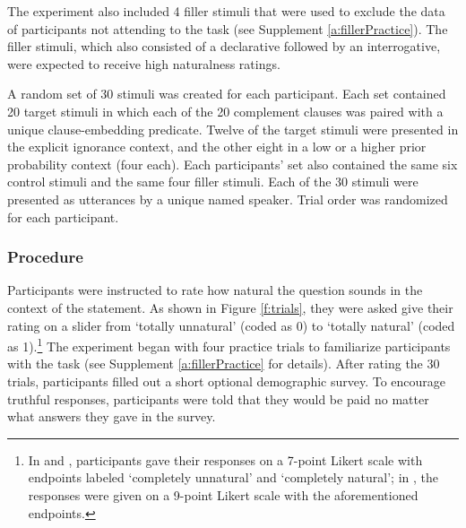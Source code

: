 \documentclass[11pt,fleqn]{article}
\newcommand{\6}{\mbox{$[\hspace*{-.6mm}[$}}
\newcommand{\9}{\mbox{$]\hspace*{-.6mm}]$}}
\begin{document}
The experiment also included 4 filler stimuli that were used to exclude the data of participants not attending to the task (see Supplement \ref{a:fillerPractice}). The filler stimuli, which also consisted of a declarative followed by an interrogative, were expected to receive high naturalness ratings.

A random set of 30 stimuli was created for each participant. Each set contained 20 target stimuli in which each of the 20 complement clauses was paired with a unique clause-embedding predicate. Twelve of the target stimuli were presented in the explicit ignorance context, and the other eight in a low or a higher prior probability context (four each). Each participants' set also contained the same six control stimuli and the same four filler stimuli. Each of the 30 stimuli were presented as utterances by a unique named speaker. Trial order was randomized for each participant. 

\subsubsection{Procedure}

Participants were instructed to rate how natural the question sounds in the context of the statement. As shown in Figure \ref{f:trials}, they were asked give their rating on a slider from `totally unnatural' (coded as 0) to `totally natural' (coded as 1).\footnote{In \citealt[Exp.~3]{mandelkern-etal2020} and \citealt[Exp.1]{kalomoiros-schwarz2024}, participants gave their responses on a 7-point Likert scale with endpoints labeled `completely unnatural' and `completely natural';  in \citealt[Exp.~2]{kalomoiros-schwarz2024}, the responses were given on a 9-point Likert scale with the aforementioned endpoints.}
The experiment began with four practice trials to familiarize participants with the task (see Supplement \ref{a:fillerPractice} for details). After rating the 30 trials, participants filled out a short optional demographic survey. To encourage truthful responses, participants were told that they would be paid no matter what answers they gave in the survey.
\end{document}
